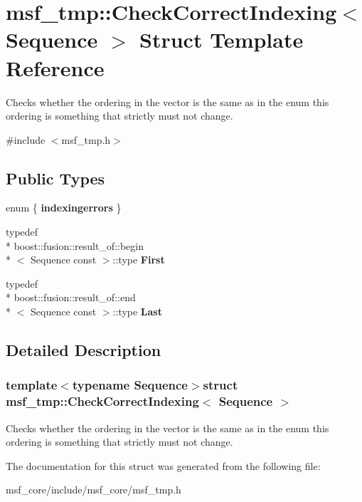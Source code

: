 \hypertarget{structmsf__tmp_1_1CheckCorrectIndexing}{\section{msf\-\_\-tmp\-:\-:Check\-Correct\-Indexing$<$ Sequence $>$ Struct Template Reference}
\label{structmsf__tmp_1_1CheckCorrectIndexing}
}


Checks whether the ordering in the vector is the same as in the enum this ordering is something that strictly must not change.  




{\ttfamily \#include $<$msf\-\_\-tmp.\-h$>$}

\subsection*{Public Types}
\begin{DoxyCompactItemize}
\item 
enum \{ {\bfseries indexingerrors}
 \}
\item 
\hypertarget{structmsf__tmp_1_1CheckCorrectIndexing_ac3c063547e54cc6ccb428b105beb2182}{typedef \\*
boost\-::fusion\-::result\-\_\-of\-::begin\\*
$<$ Sequence const  $>$\-::type {\bfseries First}}\label{structmsf__tmp_1_1CheckCorrectIndexing_ac3c063547e54cc6ccb428b105beb2182}

\item 
\hypertarget{structmsf__tmp_1_1CheckCorrectIndexing_a982feae67056fb51898a6019ab5ce02f}{typedef \\*
boost\-::fusion\-::result\-\_\-of\-::end\\*
$<$ Sequence const  $>$\-::type {\bfseries Last}}\label{structmsf__tmp_1_1CheckCorrectIndexing_a982feae67056fb51898a6019ab5ce02f}

\end{DoxyCompactItemize}


\subsection{Detailed Description}
\subsubsection*{template$<$typename Sequence$>$struct msf\-\_\-tmp\-::\-Check\-Correct\-Indexing$<$ Sequence $>$}

Checks whether the ordering in the vector is the same as in the enum this ordering is something that strictly must not change. 

The documentation for this struct was generated from the following file\-:\begin{DoxyCompactItemize}
\item 
msf\-\_\-core/include/msf\-\_\-core/msf\-\_\-tmp.\-h\end{DoxyCompactItemize}
